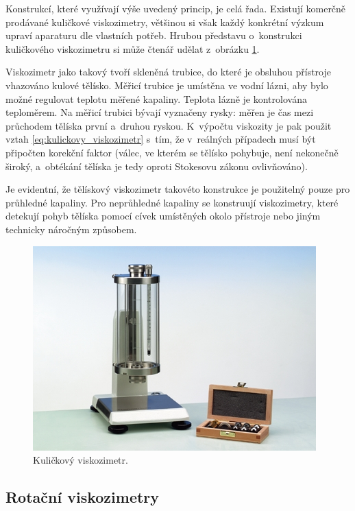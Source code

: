 \documentclass[12pt]{article}
\begin{document}
Konstrukcí, které využívají výše uvedený princip, je celá řada. Existují komerčně prodávané kuličkové viskozimetry, většinou si však každý konkrétní výzkum upraví aparaturu dle vlastních potřeb. Hrubou představu o~konstrukci kuličkového viskozimetru si může čtenář udělat z~obrázku \ref{fig:kuličkový_viskozimetr}.
\par\noindent
Viskozimetr jako takový tvoří skleněná trubice, do které je obsluhou přístroje vhazováno kulové tělísko. Měřicí trubice je umístěna ve vodní lázni, aby bylo možné regulovat teplotu měřené kapaliny. Teplota lázně je kontrolována teploměrem. Na měřicí trubici bývají vyznačeny rysky: měřen je čas mezi průchodem tělíska první a~druhou ryskou. K~výpočtu viskozity je pak použit vztah \ref{eq:kulickovy_viskozimetr} s~tím, že v~reálných případech musí být připočten korekční faktor (válec, ve kterém se tělísko pohybuje, není nekonečně široký, a~obtékání tělíska je tedy oproti Stokesovu zákonu ovlivňováno).
\par\noindent
Je evidentní, že tělískový viskozimetr takovéto konstrukce je použitelný pouze pro průhledné kapaliny. Pro neprůhledné kapaliny se konstruují viskozimetry, které detekují pohyb tělíska pomocí cívek umístěných okolo přístroje nebo jiným technicky náročným způsobem.~\cite{thesis:vysokotlaky_viskozimetr}
\begin{figure}
    \centering
    \includegraphics[width = 0.75\linewidth]{figures/kuličkový viskozimetr.jpg}
    \caption{Kuličkový viskozimetr.~\cite{Figure:kulickovy_viskozimetr}}
    \label{fig:kuličkový_viskozimetr}
\end{figure}

\subsection{Rotační viskozimetry}%
\end{document}
